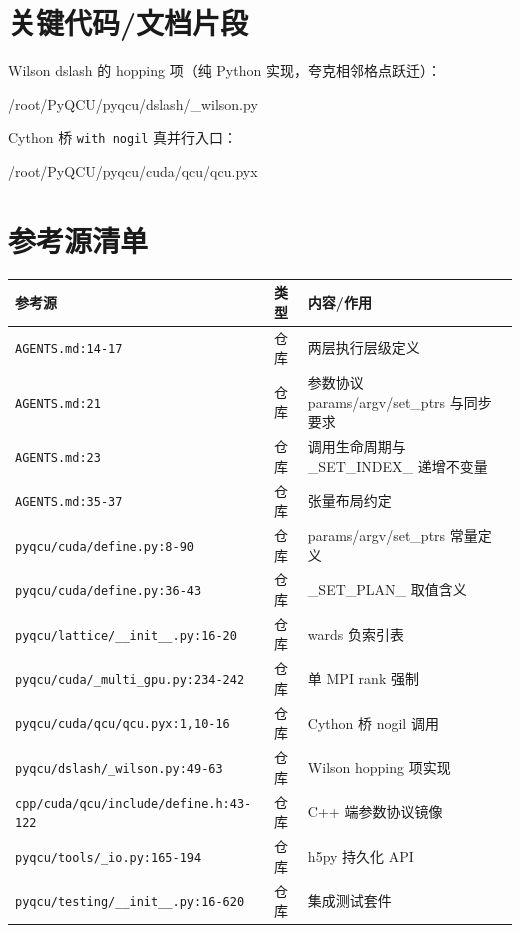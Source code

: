 \documentclass[UTF8]{ctexart}
\begin{document}
\section{关键代码/文档片段}

Wilson dslash 的 hopping 项（纯 Python 实现，夸克相邻格点跃迁）：

\begin{lstinputlisting}[firstline=49,lastline=63,language=python]{/root/PyQCU/pyqcu/dslash/_wilson.py}
\end{lstinputlisting}

Cython 桥 \texttt{with nogil} 真并行入口：

\begin{lstinputlisting}[firstline=10,lastline=16,language=python]{/root/PyQCU/pyqcu/cuda/qcu/qcu.pyx}
\end{lstinputlisting}

\section{参考源清单}

\begin{xltabular}{\textwidth}{llX}
\toprule
\textcolor{evidence}{参考源} & 类型 & 内容/作用 \\
\midrule
\endhead
\texttt{\nolinkurl{AGENTS.md:14-17}} & 仓库 & 两层执行层级定义 \\
\texttt{\nolinkurl{AGENTS.md:21}} & 仓库 & 参数协议 params/argv/set\_ptrs 与同步要求 \\
\texttt{\nolinkurl{AGENTS.md:23}} & 仓库 & 调用生命周期与 \_SET\_INDEX\_ 递增不变量 \\
\texttt{\nolinkurl{AGENTS.md:35-37}} & 仓库 & 张量布局约定 \\
\texttt{\nolinkurl{pyqcu/cuda/define.py:8-90}} & 仓库 & params/argv/set\_ptrs 常量定义 \\
\texttt{\nolinkurl{pyqcu/cuda/define.py:36-43}} & 仓库 & \_SET\_PLAN\_ 取值含义 \\
\texttt{\nolinkurl{pyqcu/lattice/__init__.py:16-20}} & 仓库 & wards 负索引表 \\
\texttt{\nolinkurl{pyqcu/cuda/_multi_gpu.py:234-242}} & 仓库 & 单 MPI rank 强制 \\
\texttt{\nolinkurl{pyqcu/cuda/qcu/qcu.pyx:1,10-16}} & 仓库 & Cython 桥 nogil 调用 \\
\texttt{\nolinkurl{pyqcu/dslash/_wilson.py:49-63}} & 仓库 & Wilson hopping 项实现 \\
\texttt{\nolinkurl{cpp/cuda/qcu/include/define.h:43-122}} & 仓库 & C++ 端参数协议镜像 \\
\texttt{\nolinkurl{pyqcu/tools/_io.py:165-194}} & 仓库 & h5py 持久化 API \\
\texttt{\nolinkurl{pyqcu/testing/__init__.py:16-620}} & 仓库 & 集成测试套件 \\
\bottomrule
\end{xltabular}
\end{document}
